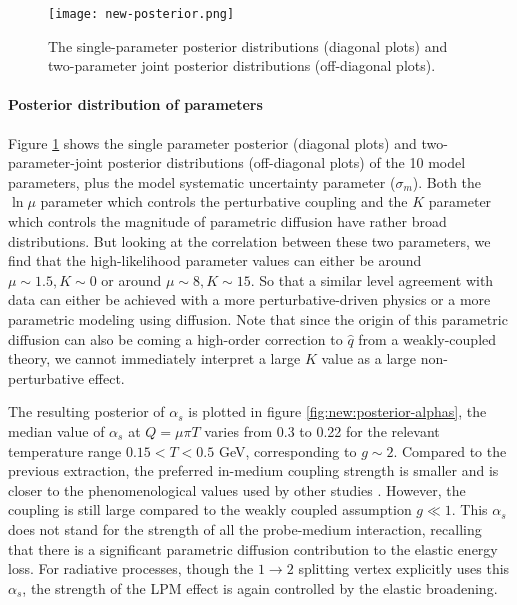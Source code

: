 \begin{figure}
\singlespacing
\centering
\texttt{[image: new-posterior.png]}
\caption[The single-parameter posterior distributions (diagonal plots) and]{The single-parameter posterior distributions (diagonal plots) and two-parameter joint posterior distributions (off-diagonal plots).}
\label{fig:new:posterior}
\end{figure}

\paragraph{Posterior distribution of parameters} Figure \ref{fig:new:posterior} shows the single parameter posterior (diagonal plots) and two-parameter-joint posterior distributions (off-diagonal plots) of the 10 model parameters, plus the model systematic uncertainty parameter ($\sigma_m$).
Both the $\ln\mu$ parameter which controls the perturbative coupling and the $K$ parameter which controls the magnitude of parametric diffusion have rather broad distributions.
But looking at the correlation between these two parameters, we find that the high-likelihood parameter values can either be around $\mu\sim 1.5, K\sim 0$ or around $\mu\sim 8, K\sim 15$.
So that a similar level agreement with data can either be achieved with a more perturbative-driven physics or a more parametric modeling using diffusion.
Note that since the origin of this parametric diffusion can also be coming a high-order correction to $\hat{q}$ from a weakly-coupled theory, we cannot immediately interpret a large $K$ value as a large non-perturbative effect.

The resulting posterior of $\alpha_s$ is plotted in figure \ref{fig:new:posterior-alphas}, the median value of $\alpha_s$ at $Q=\mu\pi T$ varies from 0.3 to 0.22 for the relevant temperature range $0.15 < T < 0.5$ GeV, corresponding to $g\sim 2$.
Compared to the previous extraction, the preferred in-medium coupling strength is smaller and is closer to the phenomenological values used by other studies \cite{Burke:2013yra}.
However, the coupling is still large compared to the weakly coupled assumption $g\ll 1$.
This $\alpha_s$ does not stand for the strength of all the probe-medium interaction, recalling that there is a significant parametric diffusion contribution to the elastic energy loss.
For radiative processes, though the $1\rightarrow 2$ splitting vertex explicitly uses this $\alpha_s$, the strength of the LPM effect is again controlled by the elastic broadening.


